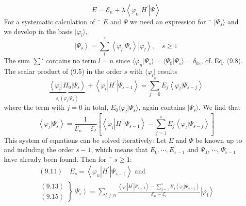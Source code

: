 \begin{equation}
    E=\mathcal{E}_{n}+\lambda\left\langle\varphi_{n}\left|H^{\prime}\right| \Psi\right\rangle
    \end{equation}
For a systematic calculation of ¨ $E$ and $\Psi$ we need an expression for ¨ $|\Psi_s\rangle$ and we develop in the basis $|\varphi_l\rangle$,
\begin{equation}
    \left|\Psi_{s}\right\rangle=\sum_{l}^{\prime}\left\langle\varphi_{l} | \Psi_{s}\right\rangle\left|\varphi_{l}\right\rangle, \quad s \geq 1
    \end{equation}
The sum $\sum'$ contains no term $l = n$ since $\langle\varphi_n|\Psi_s\rangle=\langle\Psi_0|\Psi_s\rangle=\delta_{0s}$, cf. Eq. (9.8). The scalar product of (9.5) in the order $s$ with $\langle\varphi_l|$ results
\begin{equation}
    \underbrace{\left\langle\varphi_{l}\left|H_{0}\right| \Psi_{s}\right\rangle}_{\varepsilon_{l}\left(\varphi_{l} | \Psi_{s}\right)}+\left\langle\varphi_{l}\left|H^{\prime}\right| \Psi_{s-1}\right\rangle=\sum_{j=0}^{s} E_{j}\left\langle\varphi_{l} | \Psi_{s-j}\right\rangle
    \end{equation}
where the term with $j = 0$ in total, $E_0\langle\varphi_l|\Psi_s\rangle$, again contains $|\Psi_s\rangle$. We find that
\begin{equation}
    \left\langle\varphi_{l} | \Psi_{s}\right\rangle=\frac{1}{\mathcal{E}_{n}-\mathcal{E}_{l}}\left[\left\langle\varphi_{l}\left|H^{\prime}\right| \Psi_{s-1}\right\rangle-\sum_{j=1}^{s} E_{j}\left\langle\varphi_{l} | \Psi_{s-j}\right\rangle\right]
    \end{equation}
This system of equations can be solved iteratively: Let $E$ and $\Psi$ be known up to and including the order $s - 1$, which means that $E_0, \cdots, E_{s − 1}$ and $\Psi_0$, $\cdots$, $\Psi_{s-1}$ have already been found. Then for ¨ $s\geq 1$:
\begin{equation}
\begin{array}{ll}\,{(9.11) \quad E_{s} =\left\langle\varphi_{n}\left|H^{\prime}\right| \Psi_{s-1}\right\rangle \text { and }} \\ 
{\left.\begin{array}{c}
    {(9.13)}\\{(9.15)}
\end{array}\right\}
  \left|\Psi_{s}\right\rangle=\sum_{l \neq n} \frac{\left\langle\varphi_{l}\left|H^{\prime}\right| \Psi_{s-1}\right\rangle-\sum_{j=1}^{s} E_{j}\left\langle\varphi_{l} | \Psi_{s-j}\right\rangle}{\mathcal{E}_{n}-\mathcal{E}_{l}}\left|\varphi_{l}\right\rangle}\end{array}
\end{equation}

